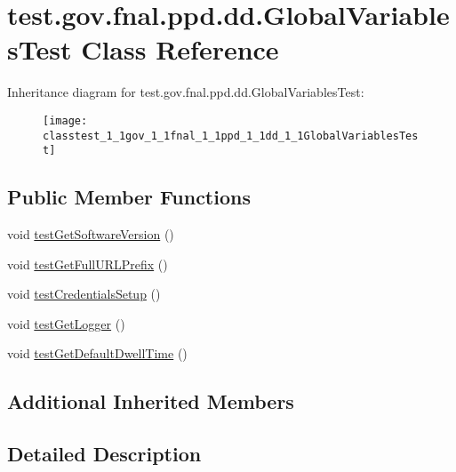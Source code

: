 \hypertarget{classtest_1_1gov_1_1fnal_1_1ppd_1_1dd_1_1GlobalVariablesTest}{\section{test.\-gov.\-fnal.\-ppd.\-dd.\-Global\-Variables\-Test Class Reference}
\label{classtest_1_1gov_1_1fnal_1_1ppd_1_1dd_1_1GlobalVariablesTest}
}
Inheritance diagram for test.\-gov.\-fnal.\-ppd.\-dd.\-Global\-Variables\-Test\-:\begin{figure}[H]
\begin{center}
\leavevmode
\texttt{[image: classtest\_1\_1gov\_1\_1fnal\_1\_1ppd\_1\_1dd\_1\_1GlobalVariablesTest]}
\end{center}
\end{figure}
\subsection*{Public Member Functions}
\begin{DoxyCompactItemize}
\item 
void \hyperlink{classtest_1_1gov_1_1fnal_1_1ppd_1_1dd_1_1GlobalVariablesTest_a9d76ca535a3675f7691c271ec42a6661}{test\-Get\-Software\-Version} ()
\item 
void \hyperlink{classtest_1_1gov_1_1fnal_1_1ppd_1_1dd_1_1GlobalVariablesTest_a58e4e646a5b64a2e4416aa99a0e8e6f4}{test\-Get\-Full\-U\-R\-L\-Prefix} ()
\item 
void \hyperlink{classtest_1_1gov_1_1fnal_1_1ppd_1_1dd_1_1GlobalVariablesTest_a4cc2ebdccd09fc82199a1619eb266526}{test\-Credentials\-Setup} ()
\item 
void \hyperlink{classtest_1_1gov_1_1fnal_1_1ppd_1_1dd_1_1GlobalVariablesTest_aea79d292fb8176c765f6ec549ed37529}{test\-Get\-Logger} ()
\item 
void \hyperlink{classtest_1_1gov_1_1fnal_1_1ppd_1_1dd_1_1GlobalVariablesTest_ae19faf852f1b8898c3c6914520550d12}{test\-Get\-Default\-Dwell\-Time} ()
\end{DoxyCompactItemize}
\subsection*{Additional Inherited Members}


\subsection{Detailed Description}


